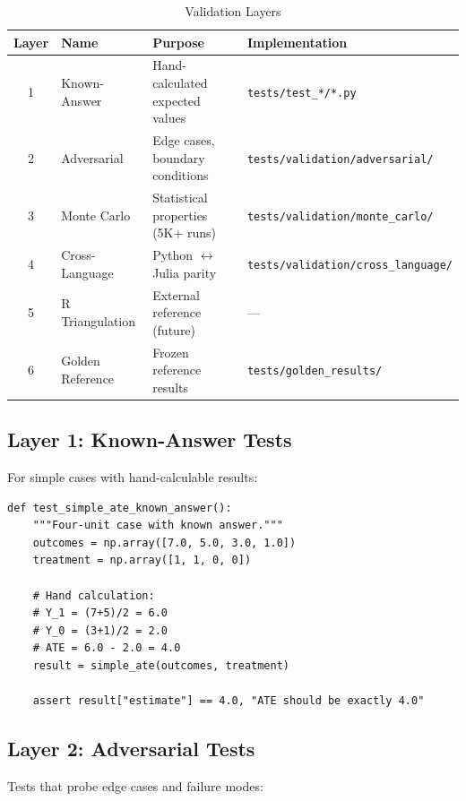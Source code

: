 \begin{table}[h]
\centering
\caption{Validation Layers}
\begin{tabular}{clll}
\toprule
Layer & Name & Purpose & Implementation \\
\midrule
1 & Known-Answer & Hand-calculated expected values & \texttt{tests/test\_*/*.py} \\
2 & Adversarial & Edge cases, boundary conditions & \texttt{tests/validation/adversarial/} \\
3 & Monte Carlo & Statistical properties (5K+ runs) & \texttt{tests/validation/monte\_carlo/} \\
4 & Cross-Language & Python $\leftrightarrow$ Julia parity & \texttt{tests/validation/cross\_language/} \\
5 & R Triangulation & External reference (future) & --- \\
6 & Golden Reference & Frozen reference results & \texttt{tests/golden\_results/} \\
\bottomrule
\end{tabular}
\end{table}

\subsection{Layer 1: Known-Answer Tests}

For simple cases with hand-calculable results:

\begin{verbatim}
def test_simple_ate_known_answer():
    """Four-unit case with known answer."""
    outcomes = np.array([7.0, 5.0, 3.0, 1.0])
    treatment = np.array([1, 1, 0, 0])

    # Hand calculation:
    # Y_1 = (7+5)/2 = 6.0
    # Y_0 = (3+1)/2 = 2.0
    # ATE = 6.0 - 2.0 = 4.0
    result = simple_ate(outcomes, treatment)

    assert result["estimate"] == 4.0, "ATE should be exactly 4.0"
\end{verbatim}

\subsection{Layer 2: Adversarial Tests}

Tests that probe edge cases and failure modes:

